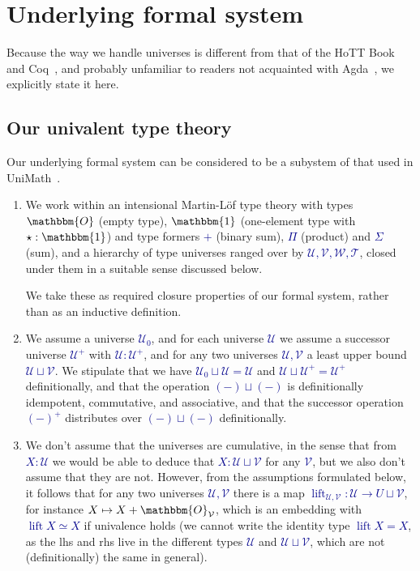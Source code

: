 \documentclass[10pt]{article}
\newcommand{\db}{\textcolor{darkblue}}
\newcommand{\m}[1]{\db{$#1$}}
\newcommand{\lift}{\operatorname{lift}}
\newcommand{\U}{\mathcal{U}}
\newcommand{\V}{\mathcal{V}}
\newcommand{\W}{\mathcal{W}}
\newcommand{\T}{\mathcal{T}}
\newcommand{\Zero}{\mathbbm{O}}
\newcommand{\One}{\mathbbm{1}}
\newcommand{\one}{\operatorname{\star}}
\theoremstyle{definition}
\begin{document}
\section{Underlying formal system} \label{foundations}

Because the way we handle universes is different from that of the HoTT
Book~\cite{hottbook} and Coq~\cite{coq}, and probably unfamiliar to
readers not acquainted with Agda~\cite{agda}, we explicitly state it here.

\subsection{Our univalent type theory}

Our underlying formal system can be considered to be a subystem of that
used in UniMath~\cite{unimath}.
\begin{enumerate}
\item We work within an intensional Martin-L\"of type theory with types
  \m{\Zero} (empty type), \m{\One} (one-element type with \m{\one:\One}) and type formers
  \m{+} (binary sum), \m{\Pi} (product) and \m{\Sigma} (sum), and
  a hierarchy of type universes ranged over by \m{\U,\V,\W,\T}, closed
  under them in a suitable sense discussed below.

  We take these as required closure properties of our formal system,
  rather than as an inductive definition.

\item We assume a universe \m{\U_0}, and for each universe \m{\U} we
  assume a successor universe \m{\U^+} with \m{\U : \U^+}, and for any
  two universes \m{\U,\V} a least upper bound \m{\U \sqcup \V}. We
  stipulate that we have \m{\U_0 \sqcup \U = \U} and \m{\U \sqcup \U^+
    = \U^+} definitionally, and that the operation \m{(-)\sqcup(-)} is
  definitionally idempotent, commutative, and associative, and that
  the successor operation \m{(-)^+} distributes over \m{(-)\sqcup(-)}
  definitionally.

\item We don't assume that the universes are cumulative, in the sense
  that from \m{X : \U} we would be able to deduce that
  \m{X : \U \sqcup \V} for any \m{\V}, but we also don't assume that they
  are not. However, from the assumptions formulated below, it follows
  that for any two universes \m{\U,\V} there is a map
  \m{\lift_{\U,\V} : \U \to U \sqcup \V}, for instance
  \m{X \mapsto X + \Zero_\V}, which is an embedding with
  \m{\lift X \simeq X} if univalence holds (we cannot write the identity
  type \m{\lift X = X}, as the lhs and rhs live in the different
  types \m{\U} and \m{\U \sqcup \V}, which are not (definitionally) the
  same in general).


\end{enumerate}
\end{document}
